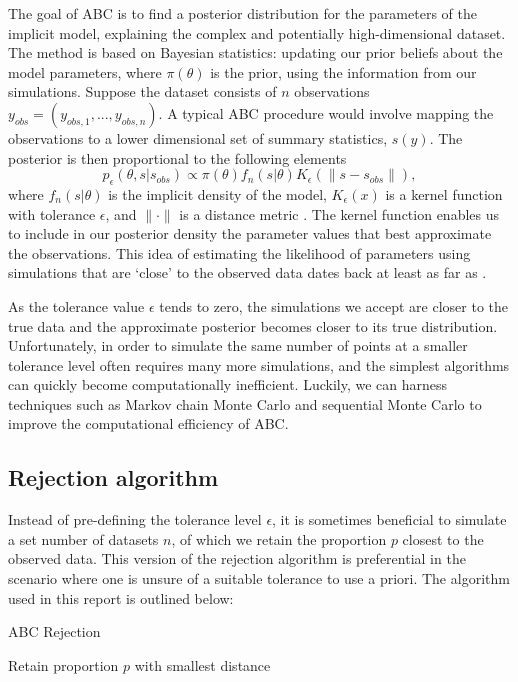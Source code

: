 \documentclass[]{article}
\begin{document}
The goal of ABC is to find a posterior distribution for the parameters of the implicit model, explaining the complex and potentially high-dimensional dataset. The method is based on Bayesian statistics: updating our prior beliefs about the model parameters, where $\pi(\theta)$ is the prior, using the information from our simulations. Suppose the dataset consists of $n$ observations $y_{obs} = (y_{obs,1}, ..., y_{obs,n})$. A typical ABC procedure would involve mapping the observations to a lower dimensional set of summary statistics, $s(y)$. The posterior is then proportional to the following elements
\begin{equation}
p_{\epsilon}(\theta, s|s_{obs}) \propto \pi(\theta)f_n(s|\theta)K_{\epsilon}(\|s - s_{obs}\|),
\end{equation}
where $f_n(s|\theta)$ is the implicit density of the model, $K_{\epsilon}(x)$ is a kernel function with tolerance $\epsilon$, and $\| \cdot \|$ is a distance metric \citep{RN2}. The kernel function enables us to include in our posterior density the parameter values that best approximate the observations. This idea of estimating the likelihood of parameters using simulations that are `close' to the observed data dates back at least as far as \cite{RN56}.

As the tolerance value $\epsilon$ tends to zero, the simulations we accept are closer to the true data and the approximate posterior becomes closer to its true distribution. Unfortunately, in order to simulate the same number of points at a smaller tolerance level often requires many more simulations, and the simplest algorithms can quickly become computationally inefficient. Luckily, we can harness techniques such as Markov chain Monte Carlo \citep{RN17, RN27} and sequential Monte Carlo \citep{RN21, RN30, RN22, RN29} to improve the computational efficiency of ABC.

\subsection{Rejection algorithm}
\label{sec1}

Instead of pre-defining the tolerance level $\epsilon$, it is sometimes beneficial to simulate a set number of datasets $n$, of which we retain the proportion $p$ closest to the observed data. This version of the rejection algorithm is preferential in the scenario where one is unsure of a suitable tolerance to use a priori. The algorithm used in this report is outlined below:

\begin{algorithm}[H]
	\label{ABC Rejection} 
	\caption{ABC Rejection}
	Retain proportion $p$ with smallest distance
\end{algorithm}
\end{document}
